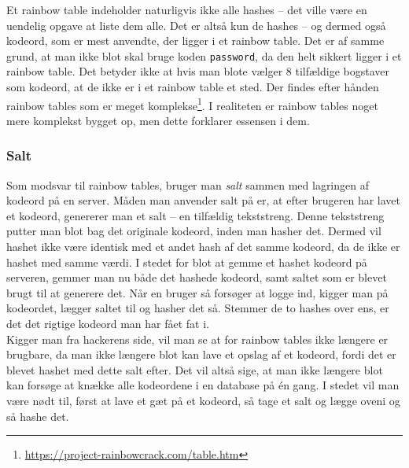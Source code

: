     Et rainbow table indeholder naturligvis ikke alle hashes -- det ville være en uendelig opgave at liste dem alle.
    Det er altså kun de hashes -- og dermed også kodeord, som er mest anvendte, der ligger i et rainbow table.
    Det er af samme grund, at man ikke blot skal bruge koden \texttt{password}, da den helt sikkert ligger i et rainbow table.
    Det betyder ikke at hvis man blote vælger 8 tilfældige bogstaver som kodeord, at de ikke er i et rainbow table et sted.
    Der findes efter hånden rainbow tables som er meget komplekse\footnote{\url{https://project-rainbowcrack.com/table.htm}}.
    I realiteten er rainbow tables noget mere komplekst bygget op, men dette forklarer essensen i dem.


    \subsubsection{Salt}
    Som modsvar til rainbow tables, bruger man \emph{salt} sammen med lagringen af kodeord på en server. \cite{version2}
    Måden man anvender salt på er, at efter brugeren har lavet et kodeord, genererer man et salt -- en tilfældig tekststreng.
    Denne tekststreng putter man blot bag det originale kodeord, inden man hasher det.
    Dermed vil hashet ikke være identisk med et andet hash af det samme kodeord, da de ikke er hashet med samme værdi.
    I stedet for blot at gemme et hashet kodeord på serveren, gemmer man nu både det hashede kodeord, samt saltet som er blevet brugt til at generere det.
    Når en bruger så forsøger at logge ind, kigger man på kodeordet, lægger saltet til og hasher det så.
    Stemmer de to hashes over ens, er det det rigtige kodeord man har fået fat i.\\
    Kigger man fra hackerens side, vil man se at for rainbow tables ikke længere er brugbare, da man ikke længere blot kan lave et opslag af et kodeord, fordi det er blevet hashet med dette salt efter.
    Det vil altså sige, at man ikke længere blot kan forsøge at knække alle kodeordene i en database på én gang.
    I stedet vil man være nødt til, først at lave et gæt på et kodeord, så tage et salt og lægge oveni og så hashe det.

